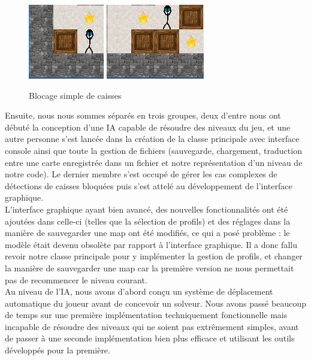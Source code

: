\documentclass[a4paper,12pt]{article} %
\begin{document}
\begin{figure}[!h]
\centering
\includegraphics[scale=0.5]{images/Capture3.PNG}
\hspace{1cm}
\includegraphics[scale=0.5]{images/Capture4.PNG}
\caption{Blocage simple de caisses}
\label{figure4}
\end{figure}

Ensuite, nous nous sommes séparés en trois groupes, deux d'entre nous ont débuté la conception d'une IA capable de résoudre des niveaux du jeu, et une autre personne s'est lancée dans la création de la classe principale avec interface console ainsi que toute la gestion de fichiers (sauvegarde, chargement, traduction entre une carte enregistrée dans un fichier et notre représentation d'un niveau de notre code). Le dernier membre s'est occupé de gérer les cas complexes de détections de caisses bloquées puis s'est attelé au développement de l'interface graphique.\\

L'interface graphique ayant bien avancé, des nouvelles fonctionnalités ont été ajoutées dans celle-ci (telles que la sélection de profils) et des réglages dans la manière de sauvegarder une map ont été modifiés, ce qui a posé problème : le modèle était devenu obsolète par rapport à l'interface graphique. Il a donc fallu revoir notre classe principale pour y implémenter la gestion de profils, et changer la manière de sauvegarder une map car la première version ne nous permettait pas de recommencer le niveau courant.\\

Au niveau de l'IA, nous avons d'abord conçu un système de déplacement automatique du joueur avant de concevoir un solveur. Nous avons passé beaucoup de temps sur une première implémentation techniquement fonctionnelle mais incapable de résoudre des niveaux qui ne soient pas extrêmement simples, avant de passer à une seconde implémentation bien plus efficace et utilisant les outils développés pour la première. 
\end{document}
